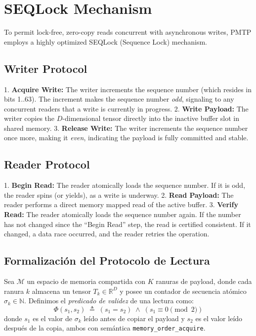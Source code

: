 \section{SEQLock Mechanism}

To permit lock-free, zero-copy reads concurrent with asynchronous writes, PMTP employs a highly optimized SEQLock (Sequence Lock) mechanism. 

\subsection{Writer Protocol}
1. \textbf{Acquire Write:} The writer increments the sequence number (which resides in bits 1..63). The increment makes the sequence number \textit{odd}, signaling to any concurrent readers that a write is currently in progress.
2. \textbf{Write Payload:} The writer copies the $D$-dimensional tensor directly into the inactive buffer slot in shared memory.
3. \textbf{Release Write:} The writer increments the sequence number once more, making it \textit{even}, indicating the payload is fully committed and stable.

\subsection{Reader Protocol}
1. \textbf{Begin Read:} The reader atomically loads the sequence number. If it is odd, the reader spins (or yields), as a write is underway.
2. \textbf{Read Payload:} The reader performs a direct memory mapped read of the active buffer.
3. \textbf{Verify Read:} The reader atomically loads the sequence number again. If the number has not changed since the ``Begin Read'' step, the read is certified consistent. If it changed, a data race occurred, and the reader retries the operation.

\subsection{Formalización del Protocolo de Lectura}

\begin{definition}
\label{def:pmtp_state}
Sea $\mathcal{M}$ un espacio de memoria compartida con $K$ ranuras de payload,
donde cada ranura $k$ almacena un tensor $T_k \in \mathbb{R}^D$ y posee un
contador de secuencia atómico $\sigma_k \in \mathbb{N}$. Definimos el
\emph{predicado de validez} de una lectura como:
\begin{equation}
\Phi(s_1, s_2) \;\triangleq\; (s_1 = s_2) \;\land\; (s_1 \equiv 0 \pmod{2})
\end{equation}
donde $s_1$ es el valor de $\sigma_k$ leído antes de copiar el payload y $s_2$ 
es el valor leído después de la copia, ambos con semántica 
\texttt{memory\_order\_acquire}.
\end{definition}

